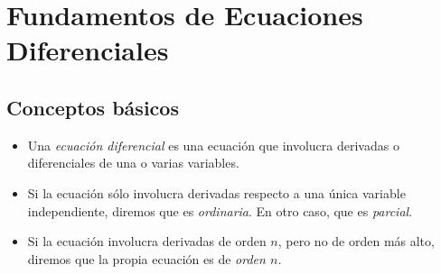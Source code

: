 \section{Fundamentos de Ecuaciones Diferenciales}

\subsection{Conceptos básicos}

\begin{definicion}
	\begin{itemize}
	\item 	Una \emph{ecuación diferencial} es una ecuación que involucra derivadas o diferenciales de una o varias variables.
	\item Si la ecuación sólo involucra derivadas respecto a una única variable independiente, diremos que es \emph{ordinaria}.  En otro caso, que es \emph{parcial}.
	\item Si la ecuación involucra derivadas de orden $n$, pero no de orden más alto, diremos que la propia ecuación es de \emph{orden $n$.}
\end{itemize}
\end{definicion}

